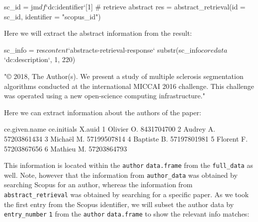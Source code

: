\begin{Schunk}
\begin{Sinput}
sc_id = jm$df$`dc:identifier`[1]
# retrieve abstract 
res = abstract_retrieval(id = sc_id, identifier = "scopus_id")
\end{Sinput}
\end{Schunk}

Here we will extract the abstract information from the result:

\begin{Schunk}
\begin{Sinput}
sc_info = res$content$`abstracts-retrieval-response`
substr(sc_info$coredata$`dc:description`, 1, 220)
\end{Sinput}
\begin{Soutput}
[1] "© 2018, The Author(s). We present a study of multiple sclerosis segmentation algorithms conducted at the international MICCAI 2016 challenge. This challenge was operated using a new open-science computing infrastructure."
\end{Soutput}
\end{Schunk}

Here we can extract information about the authors of the paper:

\begin{Schunk}
\begin{Soutput}
  ce.given.name ce.initials      X.auid
1       Olivier          O.  8431704700
2        Audrey          A. 57203861434
3       Michaël          M. 57199507814
4      Baptiste          B. 57197801981
5       Florent          F. 57203867656
6       Mathieu          M. 57203864793
\end{Soutput}
\end{Schunk}

This information is located within the \texttt{author}
\texttt{data.frame} from the \texttt{full\_data} as well. Note, however
that the information from \texttt{author\_data} was obtained by
searching Scopus for an author, whereas the information from
\texttt{abstract\_retrieval} was obtained by searching for a specific
paper. As we took the first entry from the Scopus identifier, we will
subset the author data by \texttt{entry\_number} \texttt{1} from the
\texttt{author} \texttt{data.frame} to show the relevant info matches:

